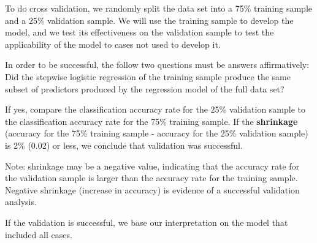 \documentclass[a4paper,12pt]{article}
\begin{document}
To do cross validation, we randomly split the data set into a 75\% training sample and a 25\% validation sample. We will use the training sample to develop the model, and we test its effectiveness on the validation sample to test the applicability of the model to cases not used to develop it.

In order to be successful, the follow two questions must be answers affirmatively:
Did the stepwise logistic regression of the training sample produce the same subset of predictors produced by the regression model of the full data set?

If yes, compare the classification accuracy rate for the 25\% validation sample to the classification accuracy rate for the 75\% training sample. If the \textbf{shrinkage} (accuracy for the 75\% training sample - accuracy for the 25\% validation sample) is 2\% (0.02) or less, we conclude that validation was successful.

Note: shrinkage may be a negative value, indicating that the accuracy rate for the validation sample is larger than the accuracy rate for the training sample. Negative shrinkage (increase in accuracy) is evidence of a successful validation analysis.

If the validation is successful, we base our interpretation on the model that included all cases.

\newpage
\end{document}
